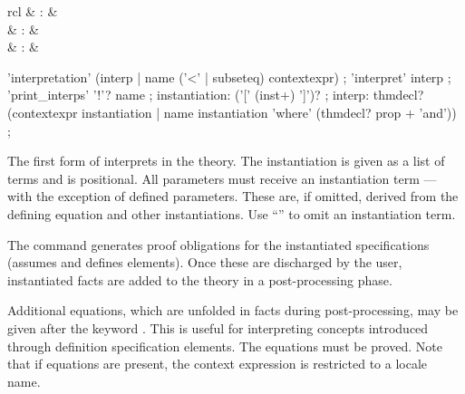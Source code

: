 \begin{isabellebody}
\begin{isamarkuptext}
  \begin{matharray}{rcl}
    \mbox{} & : &  \\
    \mbox{} & : &  \\
    \mbox{}\isa{{\isachardoublequote}\isactrlsup {\isacharasterisk}{\isachardoublequote}} & : &   \\
  \end{matharray}

  \begin{rail}
    'interpretation' (interp | name ('<' | subseteq) contextexpr)
    ;
    'interpret' interp
    ;
    'print\_interps' '!'? name
    ;
    instantiation: ('[' (inst+) ']')?
    ;
    interp: thmdecl? \\ (contextexpr instantiation |
      name instantiation 'where' (thmdecl? prop + 'and'))
    ;
  \end{rail}

  \begin{descr}

  \item [\mbox{\isa{\isacommand{interpretation}}}~\isa{{\isachardoublequote}expr\ insts\ {\isasymWHERE}\ eqns{\isachardoublequote}}]

  The first form of \mbox{} interprets  in the theory.  The instantiation is given as a list of terms
   and is positional.  All parameters must receive an
  instantiation term --- with the exception of defined parameters.
  These are, if omitted, derived from the defining equation and other
  instantiations.  Use ``\isa{{\isacharunderscore}}'' to omit an instantiation term.

  The command generates proof obligations for the instantiated
  specifications (assumes and defines elements).  Once these are
  discharged by the user, instantiated facts are added to the theory
  in a post-processing phase.

  Additional equations, which are unfolded in facts during
  post-processing, may be given after the keyword \mbox{}.
  This is useful for interpreting concepts introduced through
  definition specification elements.  The equations must be proved.
  Note that if equations are present, the context expression is
  restricted to a locale name.


\end{descr}
\end{isamarkuptext}
\end{isabellebody}

